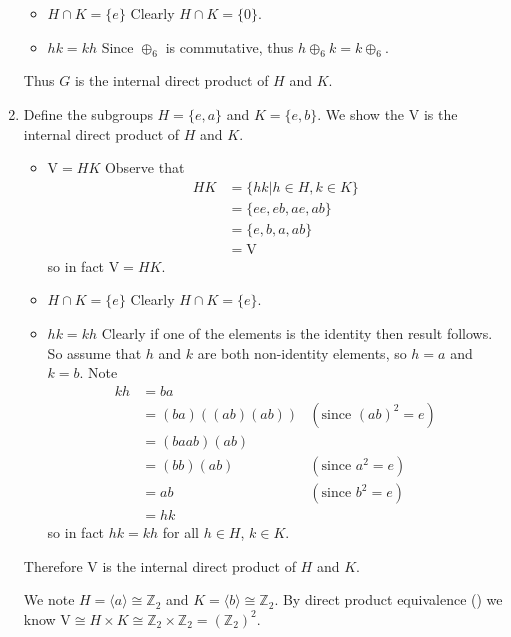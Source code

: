 \begin{enumerate}
\begin{itemize}
        \item $\boxed{H \cap K = \{e\}}$ Clearly $H \cap K = \{0\}$.

        \item $\boxed{hk = kh}$ Since $\oplus_6$ is commutative, thus $h \oplus_6 k = k \oplus_6$.
    \end{itemize}
    Thus $G$ is the internal direct product of $H$ and $K$.

    \item Define the subgroups $H = \{e, a\}$ and $K = \{e, b\}$. We show the $\mathrm{V}$ is the internal direct product of $H$ and $K$.
    \begin{itemize}
        \item $\boxed{\mathrm{V} = HK}$ Observe that
        \begin{align*}
            HK &= \{hk \vert h \in H, k \in K\}\\
            &= \{ee, eb, ae, ab\}\\
            &= \{e, b, a, ab\}\\
            &= \mathrm{V}
        \end{align*}
        so in fact $\mathrm{V} = HK$.

        \item $\boxed{H \cap K = \{e\}}$ Clearly $H \cap K = \{e\}$.

        \item $\boxed{hk = kh}$ Clearly if one of the elements is the identity then result follows. So assume that $h$ and $k$ are both non-identity elements, so $h = a$ and $k = b$. Note
        \begin{align*}
            kh &= ba\\
            &= (ba)\left((ab)(ab)\right) & (\text{since }(ab)^2 = e)\\
            &= (ba ab)(ab)\\
            &= (bb)(ab) & (\text{since }a^2 = e)\\
            &= ab & (\text{since }b^2 = e)\\
            &= hk
        \end{align*}
        so in fact $hk = kh$ for all $h \in H$, $k \in K$.
    \end{itemize}
    Therefore $\mathrm{V}$ is the internal direct product of $H$ and $K$. 
    
    We note $H = \langle a\rangle \cong \mathbb{Z}_2$ and $K = \langle b \rangle \cong \mathbb{Z}_2$. By direct product equivalence () we know $\mathrm{V} \cong H \times K \cong \mathbb{Z}_2 \times \mathbb{Z}_2 = (\mathbb{Z}_2)^2$.
\end{enumerate}

